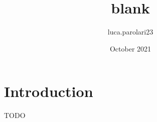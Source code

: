 \documentclass{article}
\title{blank}
\author{luca.parolari23 }
\date{October 2021}
\begin{document}
\maketitle

\section{Introduction}

TODO
\end{document}
